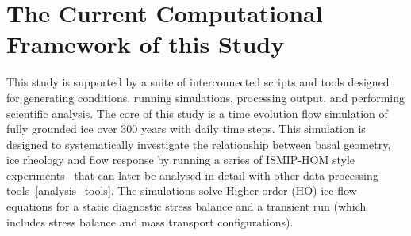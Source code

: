 \section{The Current Computational Framework of this Study}
This study is supported by a suite of interconnected scripts and tools designed for generating conditions, running simulations, processing output, and performing scientific analysis.
The core of this study is a time evolution flow simulation of fully grounded ice over 300 years with daily time steps. This simulation is designed to systematically investigate the relationship between basal geometry, ice rheology and flow response by running a series of ISMIP-HOM style experiments~\cite{Pattyn_2008} that can later be analysed in detail with other data processing tools~\ref{analysis_tools}. The simulations solve Higher order (HO) ice flow equations for a static diagnostic stress balance and a transient run (which includes stress balance and mass transport configurations).
